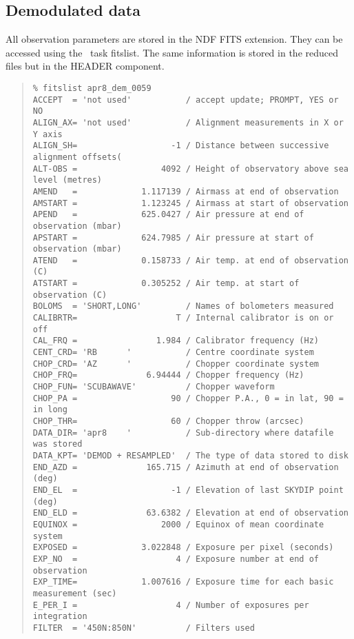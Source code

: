 \documentclass[twoside,11pt]{article}
\newcommand{\Kappa}{\xref{{\sc{Kappa}}}{sun95}{}}
\newcommand{\task}[1]{{\sf #1}}
\newcommand{\fitslist}{\xref{\task{fitslist}}{sun95}{FITSLIST}}
\newenvironment{myquote}{\begin{quote}\begin{small}}{\end{small}\end{quote}}
\newcommand{\xref}[3]{#1}
\begin{document}
\subsection{Demodulated data}

All observation parameters are stored in the NDF FITS extension. They can be
accessed using the \Kappa\ task \fitslist. The same information is
stored in the reduced files but in the HEADER component.

\begin{myquote}
\begin{verbatim}
% fitslist apr8_dem_0059
ACCEPT  = 'not used'           / accept update; PROMPT, YES or NO
ALIGN_AX= 'not used'           / Alignment measurements in X or Y axis
ALIGN_SH=                   -1 / Distance between successive alignment offsets(
ALT-OBS =                 4092 / Height of observatory above sea level (metres)
AMEND   =             1.117139 / Airmass at end of observation
AMSTART =             1.123245 / Airmass at start of observation
APEND   =             625.0427 / Air pressure at end of observation (mbar)
APSTART =             624.7985 / Air pressure at start of observation (mbar)
ATEND   =             0.158733 / Air temp. at end of observation (C)
ATSTART =             0.305252 / Air temp. at start of observation (C)
BOLOMS  = 'SHORT,LONG'         / Names of bolometers measured
CALIBRTR=                    T / Internal calibrator is on or off
CAL_FRQ =                1.984 / Calibrator frequency (Hz)
CENT_CRD= 'RB      '           / Centre coordinate system
CHOP_CRD= 'AZ      '           / Chopper coordinate system
CHOP_FRQ=              6.94444 / Chopper frequency (Hz)
CHOP_FUN= 'SCUBAWAVE'          / Chopper waveform
CHOP_PA =                   90 / Chopper P.A., 0 = in lat, 90 = in long
CHOP_THR=                   60 / Chopper throw (arcsec)
DATA_DIR= 'apr8    '           / Sub-directory where datafile was stored
DATA_KPT= 'DEMOD + RESAMPLED'  / The type of data stored to disk
END_AZD =              165.715 / Azimuth at end of observation (deg)
END_EL  =                   -1 / Elevation of last SKYDIP point (deg)
END_ELD =              63.6382 / Elevation at end of observation
EQUINOX =                 2000 / Equinox of mean coordinate system
EXPOSED =             3.022848 / Exposure per pixel (seconds)
EXP_NO  =                    4 / Exposure number at end of observation
EXP_TIME=             1.007616 / Exposure time for each basic measurement (sec)
E_PER_I =                    4 / Number of exposures per integration
FILTER  = '450N:850N'          / Filters used

\end{verbatim}
\end{myquote}
\end{document}
